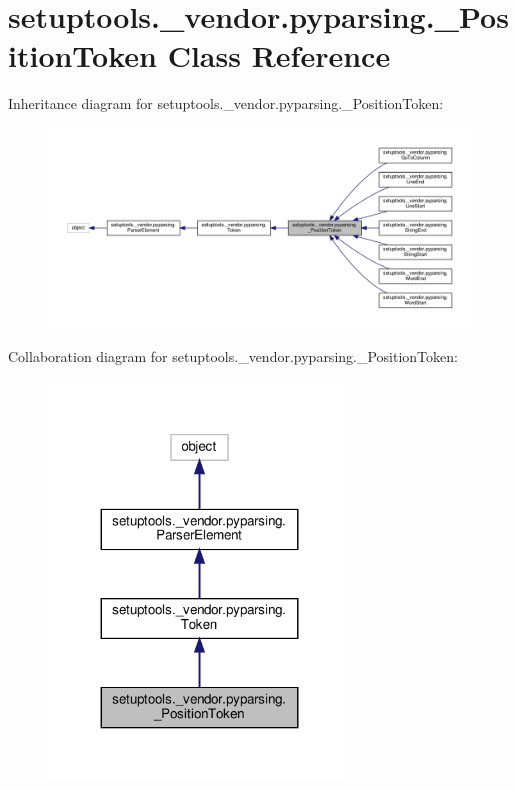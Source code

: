 \hypertarget{classsetuptools_1_1__vendor_1_1pyparsing_1_1__PositionToken}{}\section{setuptools.\+\_\+vendor.\+pyparsing.\+\_\+\+Position\+Token Class Reference}
\label{classsetuptools_1_1__vendor_1_1pyparsing_1_1__PositionToken}


Inheritance diagram for setuptools.\+\_\+vendor.\+pyparsing.\+\_\+\+Position\+Token\+:
\nopagebreak
\begin{figure}[H]
\begin{center}
\leavevmode
\includegraphics[width=350pt]{classsetuptools_1_1__vendor_1_1pyparsing_1_1__PositionToken__inherit__graph}
\end{center}
\end{figure}


Collaboration diagram for setuptools.\+\_\+vendor.\+pyparsing.\+\_\+\+Position\+Token\+:
\nopagebreak
\begin{figure}[H]
\begin{center}
\leavevmode
\includegraphics[width=227pt]{classsetuptools_1_1__vendor_1_1pyparsing_1_1__PositionToken__coll__graph}
\end{center}
\end{figure}
